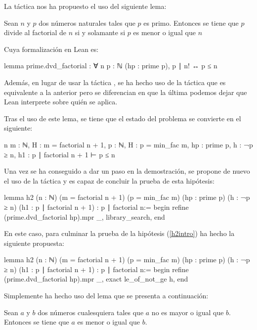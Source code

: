 \begin{itemize}
  La táctica  nos ha propuesto el uso del siguiente
  lema:
  \begin{lema}
    Sean \(n\) y \(p\) dos números naturales tales que \(p\) es
    primo. Entonces se tiene que \(p\) divide al factorial de \(n\) si y
    solamante si \(p\) es menor o igual que \(n\)
  \end{lema}

  Cuya formalización en Lean es:
  \begin{leancode}
  lemma prime.dvd_factorial : ∀ {n p : ℕ} (hp : prime p), p ∣ n! ↔ p ≤ n
  \end{leancode}

  Además, en lugar de usar la táctica , se ha hecho uso
  de la táctica  que es equivalente a la anterior pero
  se diferencian en que la última podemos dejar que Lean interprete sobre
  quién se aplica.

  Tras el uso de este lema, se tiene que el estado del problema se convierte en
  el siguiente:
  \begin{leancode}
  n m : ℕ,
  H : m = factorial n + 1,
  p : ℕ,
  H : p = min_fac m,
  hp : prime p,
  h : ¬p ≥ n,
  h1 : p ∣ factorial n + 1
  ⊢ p ≤ n
  \end{leancode}

  Una vez se ha conseguido a dar un paso en la demostración, se propone
  de nuevo el uso de la táctica
   y es capaz de concluir la
  prueba de esta hipótesis:
  \begin{leancode}
lemma h2
  (n : ℕ)
  (m = factorial n + 1)
  (p = min_fac m)
  (hp : prime p)
  (h : ¬p ≥ n)
  (h1 : p ∣ factorial n + 1)
  : p ∣ factorial n:=
begin
  refine (prime.dvd_factorial hp).mpr _,
  library_search,
end
  \end{leancode}

  En este caso, para culminar la prueba de la hipótesis (\ref{h2intro}) ha
  hecho la siguiente propuesta:
  \begin{leancode}
lemma h2
  (n : ℕ)
  (m = factorial n + 1)
  (p = min_fac m)
  (hp : prime p)
  (h : ¬p ≥ n)
  (h1 : p ∣ factorial n + 1)
  : p ∣ factorial n:=
begin
  refine (prime.dvd_factorial hp).mpr _,
  exact le_of_not_ge h,
end
  \end{leancode}

  Simplemente ha hecho uso del lema que se presenta a continuación:
  \begin{lema}
    Sean \(a\) y \(b\) dos números cualesquiera tales que \(a\) no es
    mayor o igual que \(b\). Entonces se tiene que \(a\) es menor o
    igual que \(b\).
  \end{lema}


\end{itemize}
